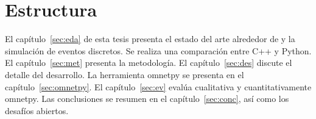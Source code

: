 \section{Estructura}

El capítulo~\ref{sec:eda} de esta tesis presenta el estado del arte alrededor
de \omnetpp{} y la simulación de eventos discretos. Se realiza una comparación
entre C++ y Python. El capítulo~\ref{sec:met} presenta la metodología. El
capítulo~\ref{sec:des} discute el detalle del desarrollo. La herramienta
omnetpy se presenta en el capítulo~\ref{sec:omnetpy}. El capítulo~\ref{sec:ev}
evalúa cualitativa y cuantitativamente omnetpy. Las conclusiones se resumen en
el capítulo~\ref{sec:conc}, así como los desafíos abiertos.
